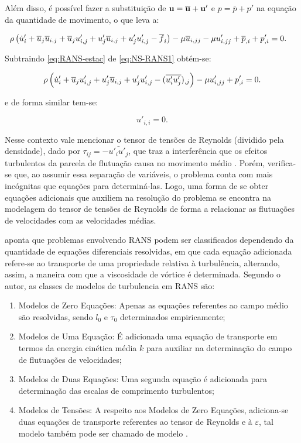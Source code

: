\documentclass[_ArquivoPrincipal.tex]{subfiles}
\begin{document}
Além disso, é possível fazer a substituição de $\mathbf{u}=\overline{\mathbf{u}}+\mathbf{u}'$ e $p=\bar{p}+p'$ na equação da quantidade de movimento, o que leva a:

\begin{equation}
    \begin{split}
        &\rho\left({\dot{u}'_i+\overline{u}_j\overline{u}_{i,j}+\overline{u}_ju'_{i,j}+u'_j\overline{u}_{i,j}+u'_ju'_{i,j}-\overline{f}_i}\right)-\mu\overline{u}_{i,jj}-\mu u'_{i,jj}+\overline{p}_{,i}+p'_{,i}=0\text{.}
    \end{split}
    \label{eq:NS-RANS1}
\end{equation}

Subtraindo \ref{eq:RANS-estac} de \ref{eq:NS-RANS1} obtém-se:

\begin{equation}
    \rho\left({\dot{u}'_i+\overline{u}_ju'_{i,j}+u'_j\overline{u}_{i,j}+u'_ju'_{i,j}-(\overline{u'_iu'_j})_{,j}}\right)-\mu u'_{i,jj}+p'_{,i}=0\text{.}
\end{equation}

\noindent e de forma similar tem-se:

\begin{equation}
    u'_{i,i}=0\text{.}
\end{equation}

Nesse contexto vale mencionar o tensor de tensões de Reynolds (dividido pela densidade), dado por $\tau_{ij}=-\bar{u'_iu'_j}$, que traz a interferência que os efeitos turbulentos da parcela de flutuação causa no movimento médio \cite{chou1945velocity,alfonsi2009reynolds}. Porém, verifica-se que, ao assumir essa separação de variáveis, o problema conta com mais incógnitas que equações para determiná-las. Logo, uma forma de se obter equações adicionais que auxiliem na resolução do problema se encontra na modelagem do tensor de tensões de Reynolds de forma a relacionar as flutuações de velocidades com as velocidades médias.

 aponta que problemas envolvendo RANS podem ser classificados dependendo da quantidade de equações diferenciais resolvidas, em que cada equação adicionada refere-se ao transporte de uma propriedade relativa à turbulência, alterando, assim, a maneira com que a viscosidade de vórtice é determinada. Segundo o autor, as classes de modelos de turbulencia em RANS são:

\begin{enumerate}[label=\alph*.]
    \item Modelos de Zero Equações: Apenas as equações referentes ao campo médio são resolvidas, sendo $l_0$ e $\tau_0$ determinados empiricamente;
    \item Modelos de Uma Equação: É adicionada uma equação de transporte em termos da energia cinética média $k$ para auxiliar na determinação do campo de flutuações de velocidades;
    \item Modelos de Duas Equações: Uma segunda equação é adicionada para determinação das escalas de comprimento turbulentos;
    \item Modelos de Tensões: A respeito aos Modelos de Zero Equações, adiciona-se duas equações de transporte referentes ao tensor de Reynolds e à $\varepsilon$, tal modelo também pode ser chamado de modelo \te.
\end{enumerate}
\end{document}
